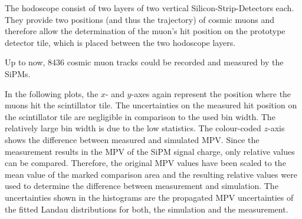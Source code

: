 The hodoscope consist of two layers of two vertical Silicon-Strip-Detectors each. They provide two positions (and thus the trajectory) of  cosmic muons and therefore allow the determination of the muon's hit position on the prototype detector tile, which is placed between the two hodoscope layers.

Up to now, 8436 cosmic muon tracks could be recorded and measured by the SiPMs.



In the following plots, the $x$- and $y$-axes again represent the position where the muons hit the scintillator tile. The uncertainties on the measured hit position on the scintillator tile are negligible in comparison to the used bin width. The relatively large bin width is due to the low statistics.
The colour-coded $z$-axis shows the difference between measured and simulated MPV. Since the measurement results in the MPV of the SiPM signal charge, only relative values can be compared. Therefore, the original MPV values have been scaled to the mean value of the marked comparison area and the resulting relative values were used to determine the difference between measurement and simulation. The uncertainties shown in the histograms are the propagated MPV uncertainties of the fitted Landau distributions for both, the simulation and the measurement.



